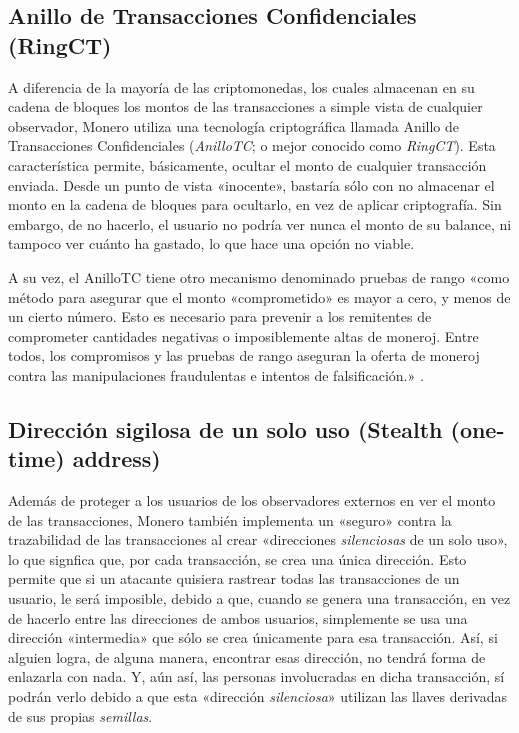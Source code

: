 \documentclass[12pt,a4paper,twoside]{book}
\begin{document}
\subsection{Anillo de Transacciones Confidenciales (RingCT)}
A diferencia de la mayoría de las criptomonedas, los cuales almacenan en su cadena de bloques los montos de las transacciones a simple vista de cualquier observador, Monero utiliza una tecnología criptográfica llamada Anillo de Transacciones Confidenciales (\textit{AnilloTC}; o mejor conocido como \textit{RingCT}). Esta característica permite, básicamente, ocultar el monto de cualquier transacción enviada. Desde un punto de vista «inocente», bastaría sólo con no almacenar el monto en la cadena de bloques para ocultarlo, en vez de aplicar criptografía. Sin embargo, de no hacerlo, el usuario no podría ver nunca el monto de su balance, ni tampoco ver cuánto ha gastado, lo que hace una opción no viable.

A su vez, el AnilloTC tiene otro mecanismo denominado pruebas de rango «como método para asegurar que el monto «comprometido» es mayor a cero, y menos de un cierto número. Esto es necesario para prevenir a los remitentes de comprometer cantidades negativas o imposiblemente altas de moneroj. Entre todos, los compromisos y las pruebas de rango aseguran la oferta de moneroj contra las manipulaciones fraudulentas e intentos de falsificación.» \cite[págs. 62]{monero:master}.

\subsection{Dirección sigilosa de un solo uso (Stealth (one-time) address)}
Además de proteger a los usuarios de los observadores externos en ver el monto de las transacciones, Monero también implementa un «seguro» contra la trazabilidad de las transacciones al crear «direcciones \textit{silenciosas} de un solo uso», lo que signfica que, por cada transacción, se crea una única dirección. Esto permite que si un atacante quisiera rastrear todas las transacciones de un usuario, le será imposible, debido a que, cuando se genera una transacción, en vez de hacerlo entre las direcciones de ambos usuarios, simplemente se usa una dirección «intermedia» que sólo se crea únicamente para esa transacción. Así, si alguien logra, de alguna manera, encontrar esas dirección, no tendrá forma de enlazarla con nada. Y, aún así, las personas involucradas en dicha transacción, sí podrán verlo debido a que esta «dirección \textit{silenciosa}» utilizan las llaves derivadas de sus propias \textit{semillas}.
\end{document}
